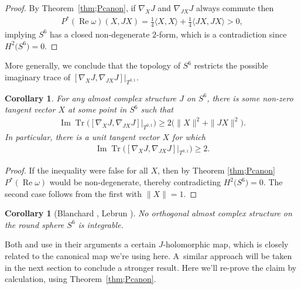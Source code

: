 \documentclass[pdftex]{sigma}
\DeclareMathOperator{\Tr}{Tr}
\newtheorem{cor}[thm]{Corollary}
\numberwithin{equation}{section}
\begin{document}
\begin{proof}By Theorem~\ref{thm;Pcanon}, if $\nabla_X J$ and $\nabla_{JX} J$ always commute then
\begin{gather*}
P^* (\operatorname{Re} \omega ) (X,JX) = \frac 1 4 \langle X,X\rangle + \frac 1 4 \langle JX,JX\rangle > 0,
\end{gather*}
implying $S^6$ has a closed non-degenerate $2$-form, which is a contradiction since $H^2\big(S^6\big) = 0$.
\end{proof}

More generally, we conclude that the topology of $S^6$ restricts the possible imaginary trace of $ [ \nabla_X J , \nabla_{JX} J ] \big|_{T^{0,1}} $.

\begin{cor}For any almost complex structure $J$ on $S^6$, there is some non-zero tangent vector $X$ at some point in $S^6$ such that
\begin{gather*}
\operatorname{Im} \Tr \big( [ \nabla_X J , \nabla_{JX} J] \big|_{T^{0,1}} \big) \geq 2 \big( \|X \|^2 + \|JX \|^2 \big).
\end{gather*}
In particular, there is a unit tangent vector $X$ for which
\begin{gather*}
\operatorname{Im} \Tr \big( [ \nabla_X J , \nabla_{JX} J ] \big|_{T^{0,1}} \big) \geq 2.
\end{gather*}
\end{cor}

\begin{proof}
If the inequality were false for all $X$, then by Theorem \ref{thm;Pcanon} $P^*(\operatorname{Re} \omega)$ would be non-degenerate, thereby contradicting $H^2\big(S^6\big) = 0$. The second case follows from the first with $\|X\|=1$.
\end{proof}

\begin{cor}[Blanchard \cite{Bl}, Lebrun \cite{L}] \label{cor;L}No orthogonal almost complex structure on the round sphere $S^6$ is integrable.
\end{cor}

Both \cite{Bl} and \cite{L} use in their arguments a certain $J$-holomorphic map, which is closely related to the canonical map we're using here. A~similar approach will be taken in the next section to conclude a stronger result. Here we'll re-prove the claim by calculation, using Theorem~\ref{thm;Pcanon}.
\end{document}

